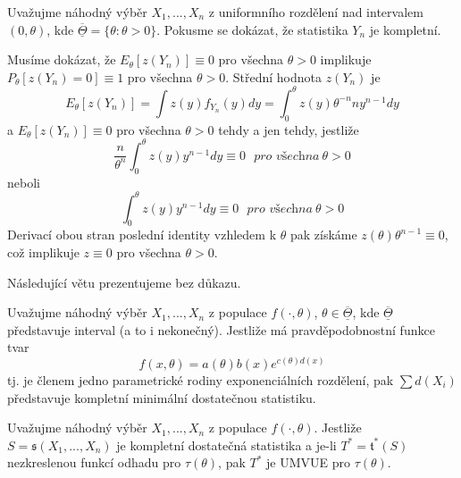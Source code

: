 \begin{example}
Uvažujme náhodný výběr $X_1, ..., X_n$ z uniformního rozdělení nad intervalem $(0, \theta)$, kde $\overline{\underline{\Theta}} = \{\theta: \theta > 0\}$. Pokusme se dokázat, že statistika $Y_n$ je kompletní.

Musíme dokázat, že $E_{\theta}[\mathit{z}(Y_n)] \equiv 0$ pro všechna $\theta > 0$ implikuje $P_{\theta}[\mathit{z}(Y_n) = 0] \equiv 1$ pro všechna $\theta > 0$. Střední hodnota $\mathit{z}(Y_n)$ je
\begin{equation*}
E_{\theta}[\mathit{z}(Y_n)] = \int \mathit{z}(y)f_{Y_n}(y)dy = \int_0^{\theta}\mathit{z}(y)\theta^{-n}ny^{n - 1}dy
\end{equation*}
a $E_{\theta}[\mathit{z}(Y_n)] \equiv 0$ pro všechna $\theta > 0$ tehdy a jen tehdy, jestliže
\begin{equation*}
\frac{n}{\theta^n}\int_0^{\theta}\mathit{z}(y)y^{n - 1}dy \equiv 0 ~~~ \textit{pro všechna}~\theta > 0
\end{equation*}
neboli
\begin{equation*}
\int_0^{\theta}\mathit{z}(y)y^{n - 1}dy \equiv 0 ~~~\textit{pro všechna}~\theta > 0
\end{equation*}
Derivací obou stran poslední identity vzhledem k $\theta$ pak získáme $\mathit{z}(\theta)\theta^{n - 1} \equiv 0$, což implikuje $\mathit{z} \equiv 0$ pro všechna $\theta > 0$.
\end{example}

Následující větu prezentujeme bez důkazu.

\begin{theorem}
Uvažujme náhodný výběr $X_1, ..., X_n$ z populace $f(\cdot, \theta)$, $\theta \in \overline{\underline{\Theta}}$, kde $\overline{\underline{\Theta}}$ představuje interval (a to i nekonečný). Jestliže má pravděpodobnostní funkce tvar
\begin{equation*}
f(x, \theta) = a(\theta)b(x)e^{c(\theta)d(x)}
\end{equation*}
tj. je členem jedno parametrické rodiny exponenciálních rozdělení, pak $\sum d(X_i)$ představuje kompletní minimální dostatečnou statistiku.
\end{theorem}

\begin{theorem}
Uvažujme náhodný výběr $X_1, ..., X_n$ z populace $f(\cdot, \theta)$. Jestliže $S = \mathfrak{s}(X_1, ..., X_n)$ je kompletní dostatečná statistika a je-li $T^* = \mathfrak{t}^*(S)$ nezkreslenou funkcí odhadu pro $\tau(\theta)$, pak $T^*$ je UMVUE pro $\tau(\theta)$.
\end{theorem}


